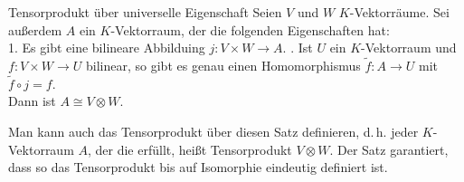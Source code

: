 \begin{Satz}{Tensorprodukt über universelle Eigenschaft}
    Seien $V$ und $W$ $K$-Vektorräume.
    Sei außerdem $A$ ein $K$-Vektorraum, der die folgenden Eigenschaften
    hat: \\
    1. Es gibt eine bilineare Abbilduing $j: V \times W \rightarrow A$. . Ist $U$ ein $K$-Vektorraum und $f: V \times W \rightarrow U$ bilinear,
    so gibt es genau einen Homomorphismus $\widetilde{f}: A \rightarrow U$
    mit $\widetilde{f} \circ j = f$. \\
    Dann ist $A \cong V \otimes W$.
\end{Satz}

\begin{Bem}
    Man kann auch das Tensorprodukt über diesen Satz definieren, d.\,h.
    jeder $K$-Vektorraum $A$, der die 
    erfüllt, heißt Tensorprodukt $V \otimes W$.
    Der Satz garantiert, dass so das Tensorprodukt bis auf Isomorphie eindeutig
    definiert ist.
\end{Bem}

\pagebreak
